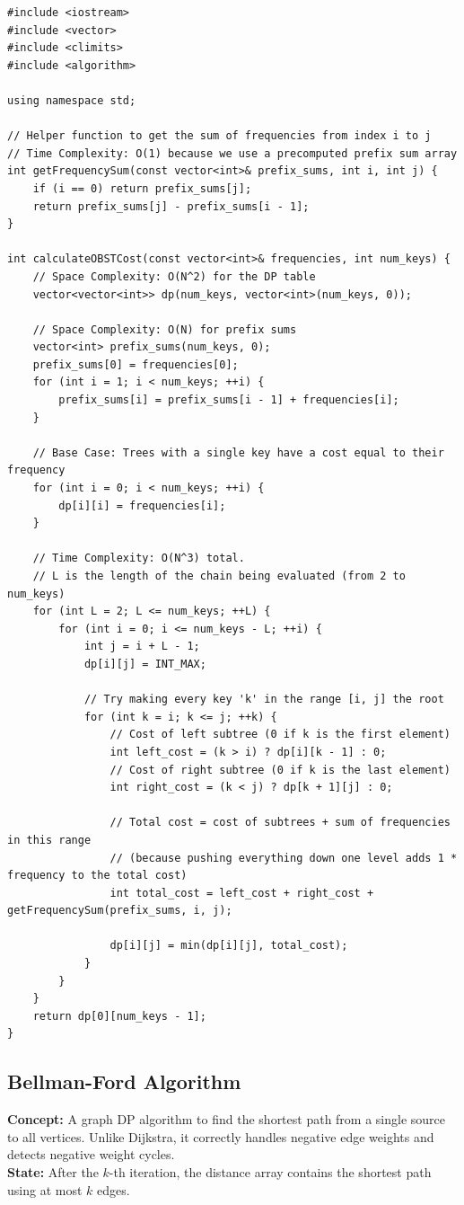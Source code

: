 \begin{lstlisting}
#include <iostream>
#include <vector>
#include <climits>
#include <algorithm>

using namespace std;

// Helper function to get the sum of frequencies from index i to j
// Time Complexity: O(1) because we use a precomputed prefix sum array
int getFrequencySum(const vector<int>& prefix_sums, int i, int j) {
    if (i == 0) return prefix_sums[j];
    return prefix_sums[j] - prefix_sums[i - 1];
}

int calculateOBSTCost(const vector<int>& frequencies, int num_keys) {
    // Space Complexity: O(N^2) for the DP table
    vector<vector<int>> dp(num_keys, vector<int>(num_keys, 0));
    
    // Space Complexity: O(N) for prefix sums
    vector<int> prefix_sums(num_keys, 0);
    prefix_sums[0] = frequencies[0];
    for (int i = 1; i < num_keys; ++i) {
        prefix_sums[i] = prefix_sums[i - 1] + frequencies[i];
    }
    
    // Base Case: Trees with a single key have a cost equal to their frequency
    for (int i = 0; i < num_keys; ++i) {
        dp[i][i] = frequencies[i];
    }
    
    // Time Complexity: O(N^3) total.
    // L is the length of the chain being evaluated (from 2 to num_keys)
    for (int L = 2; L <= num_keys; ++L) {
        for (int i = 0; i <= num_keys - L; ++i) {
            int j = i + L - 1;
            dp[i][j] = INT_MAX;
            
            // Try making every key 'k' in the range [i, j] the root
            for (int k = i; k <= j; ++k) {
                // Cost of left subtree (0 if k is the first element)
                int left_cost = (k > i) ? dp[i][k - 1] : 0;
                // Cost of right subtree (0 if k is the last element)
                int right_cost = (k < j) ? dp[k + 1][j] : 0;
                
                // Total cost = cost of subtrees + sum of frequencies in this range
                // (because pushing everything down one level adds 1 * frequency to the total cost)
                int total_cost = left_cost + right_cost + getFrequencySum(prefix_sums, i, j);
                
                dp[i][j] = min(dp[i][j], total_cost);
            }
        }
    }
    return dp[0][num_keys - 1];
}
\end{lstlisting}

\subsection{Bellman-Ford Algorithm}
\textbf{Concept:} A graph DP algorithm to find the shortest path from a single source to all vertices. Unlike Dijkstra, it correctly handles negative edge weights and detects negative weight cycles. \\
\textbf{State:} After the $k$-th iteration, the distance array contains the shortest path using at most $k$ edges.

